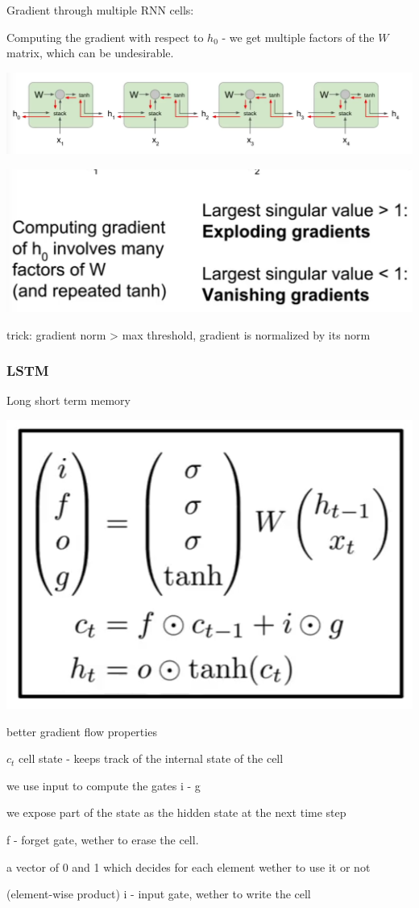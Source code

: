 Gradient through multiple RNN cells: 

Computing the gradient with respect to $h_0$ - we get multiple factors of the $W$ matrix, which can be undesirable. 

\includegraphics[width=0.5\columnwidth]{fei_fei_li/lecture_10/backprop_multi_layer.png}

\includegraphics[width=0.5\columnwidth]{"fei_fei_li/lecture_10/gradients.png"}

trick: gradient norm > max threshold, gradient is normalized by its norm

\subsubsection{LSTM}

Long short term memory

\includegraphics[width=0.5\columnwidth]{fei_fei_li/lecture_10/lstm.png}

better gradient flow properties

$c_t$ cell state - keeps track of the internal state of the cell

we use input to compute the gates i - g

we expose part of the state as the hidden state at the next time step

f - forget gate, wether to erase the cell.

a vector of 0 and 1 which decides for each element wether to use it or not

(element-wise product)
i - input gate, wether to write the cell

